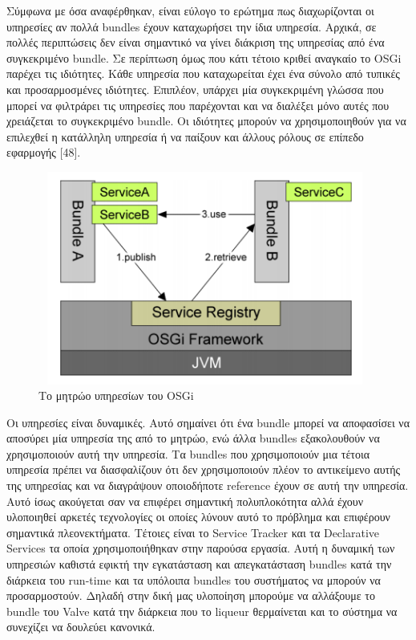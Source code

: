 	Σύμφωνα με όσα αναφέρθηκαν, είναι εύλογο το ερώτημα πως διαχωρίζονται οι υπηρεσίες αν πολλά bundles έχουν καταχωρήσει την ίδια υπηρεσία. Αρχικά, σε πολλές περιπτώσεις δεν είναι σημαντικό να γίνει διάκριση της υπηρεσίας από ένα συγκεκριμένο bundle. Σε περίπτωση όμως που κάτι τέτοιο κριθεί αναγκαίο το OSGi παρέχει τις ιδιότητες. Κάθε υπηρεσία που καταχωρείται έχει ένα σύνολο από τυπικές και προσαρμοσμένες ιδιότητες. Επιπλέον, υπάρχει μία συγκεκριμένη γλώσσα που μπορεί να φιλτράρει τις υπηρεσίες που παρέχονται και να διαλέξει μόνο αυτές που χρειάζεται το συγκεκριμένο bundle. Οι ιδιότητες μπορούν να χρησιμοποιηθούν για να επιλεχθεί η κατάλληλη υπηρεσία ή να παίξουν και άλλους ρόλους σε επίπεδο εφαρμογής [48].
	
\begin{figure}[htbp]
	\centering
		\includegraphics[height=7cm,width=11cm]{Figures/10.png}
	\caption{Το μητρώο υπηρεσίων του OSGi \cite{Tavares} }	
\end{figure}

Οι υπηρεσίες είναι δυναμικές. Αυτό σημαίνει ότι ένα bundle μπορεί να αποφασίσει να  αποσύρει μία υπηρεσία της από το μητρώο, ενώ άλλα bundles εξακολουθούν να χρησιμοποιούν αυτή την υπηρεσία. Τα bundles που χρησιμοποιούν μια τέτοια υπηρεσία πρέπει να διασφαλίζουν ότι δεν χρησιμοποιούν πλέον το αντικείμενο αυτής της υπηρεσίας και να διαγράψουν οποιοδήποτε reference έχουν σε αυτή την υπηρεσία. Αυτό ίσως ακούγεται σαν να επιφέρει σημαντική πολυπλοκότητα αλλά έχουν υλοποιηθεί αρκετές τεχνολογίες οι οποίες λύνουν αυτό το πρόβλημα και επιφέρουν σημαντικά πλεονεκτήματα. Τέτοιες είναι το Service Tracker και τα Declarative Services τα οποία χρησιμοποιήθηκαν στην παρούσα εργασία. Αυτή η δυναμική των υπηρεσιών καθιστά εφικτή την εγκατάσταση και απεγκατάσταση bundles κατά την διάρκεια του run-time και τα υπόλοιπα bundles του συστήματος να μπορούν να προσαρμοστούν. Δηλαδή στην δική μας υλοποίηση μπορούμε να αλλάξουμε το bundle του Valve κατά την διάρκεια που το liqueur θερμαίνεται και το σύστημα να συνεχίζει να δουλεύει κανονικά. 



